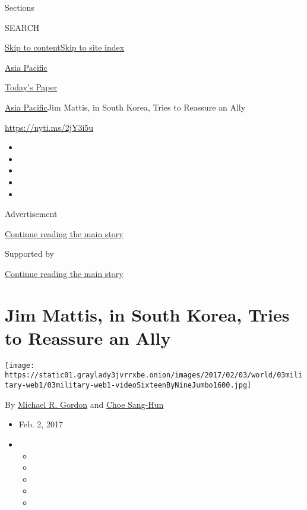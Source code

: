 Sections

SEARCH

\protect\hyperlink{site-content}{Skip to
content}\protect\hyperlink{site-index}{Skip to site index}

\href{https://www.nytimes3xbfgragh.onion/section/world/asia}{Asia
Pacific}

\href{https://myaccount.nytimes3xbfgragh.onion/auth/login?response_type=cookie\&client_id=vi}{}

\href{https://www.nytimes3xbfgragh.onion/section/todayspaper}{Today's
Paper}

\href{/section/world/asia}{Asia Pacific}\textbar{}Jim Mattis, in South
Korea, Tries to Reassure an Ally

\url{https://nyti.ms/2jY3i5u}

\begin{itemize}
\item
\item
\item
\item
\item
\end{itemize}

Advertisement

\protect\hyperlink{after-top}{Continue reading the main story}

Supported by

\protect\hyperlink{after-sponsor}{Continue reading the main story}

\hypertarget{jim-mattis-in-south-korea-tries-to-reassure-an-ally}{%
\section{Jim Mattis, in South Korea, Tries to Reassure an
Ally}\label{jim-mattis-in-south-korea-tries-to-reassure-an-ally}}

\texttt{[image: https://static01.graylady3jvrrxbe.onion/images/2017/02/03/world/03military-web1/03military-web1-videoSixteenByNineJumbo1600.jpg]}

By \href{http://www.nytimes3xbfgragh.onion/by/michael-r-gordon}{Michael
R. Gordon} and
\href{http://www.nytimes3xbfgragh.onion/by/choe-sang-hun}{Choe Sang-Hun}

\begin{itemize}
\item
  Feb. 2, 2017
\item
  \begin{itemize}
  \item
  \item
  \item
  \item
  \item
  \end{itemize}
\end{itemize}

